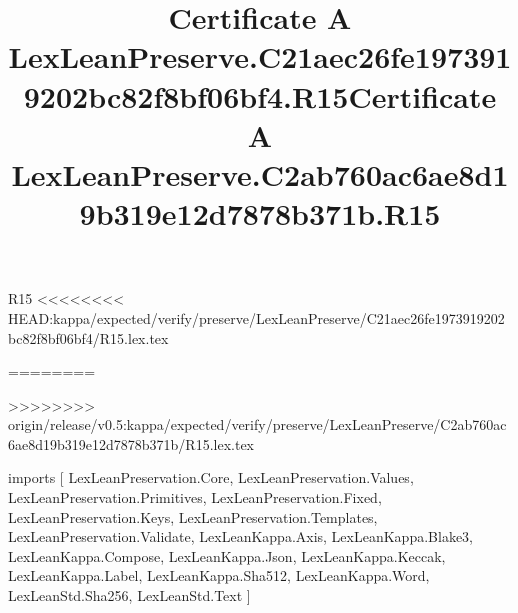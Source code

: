 \begin{lexlean}{R15}
<<<<<<<< HEAD:kappa/expected/verify/preserve/LexLeanPreserve/C21aec26fe1973919202bc82f8bf06bf4/R15.lex.tex
\title{Certificate A LexLeanPreserve.C21aec26fe1973919202bc82f8bf06bf4.R15}
========
\title{Certificate A LexLeanPreserve.C2ab760ac6ae8d19b319e12d7878b371b.R15}
>>>>>>>> origin/release/v0.5:kappa/expected/verify/preserve/LexLeanPreserve/C2ab760ac6ae8d19b319e12d7878b371b/R15.lex.tex
\begin{coremodule}
imports [
  LexLeanPreservation.Core,
  LexLeanPreservation.Values,
  LexLeanPreservation.Primitives,
  LexLeanPreservation.Fixed,
  LexLeanPreservation.Keys,
  LexLeanPreservation.Templates,
  LexLeanPreservation.Validate,
  LexLeanKappa.Axis,
  LexLeanKappa.Blake3,
  LexLeanKappa.Compose,
  LexLeanKappa.Json,
  LexLeanKappa.Keccak,
  LexLeanKappa.Label,
  LexLeanKappa.Sha512,
  LexLeanKappa.Word,
  LexLeanStd.Sha256,
  LexLeanStd.Text
]


\end{coremodule}
\end{lexlean}
